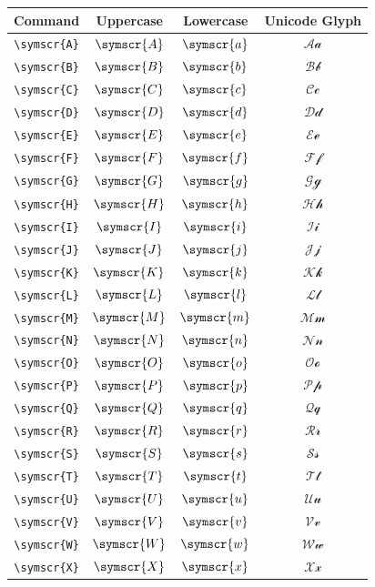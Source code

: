 \documentclass[12pt,a4paper]{article}
\begin{document}
\begin{longtable}{|c|c|c|c|}
\hline
\textbf{Command} & \textbf{Uppercase} & \textbf{Lowercase} & \textbf{Unicode Glyph} \\
\hline
\verb|\symscr{A}| & $\symscr{A}$ & $\symscr{a}$ & $ 𝒜 𝒶 $ \\
\verb|\symscr{B}| & $\symscr{B}$ & $\symscr{b}$ & $ ℬ 𝒷 $ \\
\verb|\symscr{C}| & $\symscr{C}$ & $\symscr{c}$ & $ 𝒞 𝒸 $ \\
\verb|\symscr{D}| & $\symscr{D}$ & $\symscr{d}$ & $ 𝒟 𝒹 $ \\
\verb|\symscr{E}| & $\symscr{E}$ & $\symscr{e}$ & $ ℰ ℯ $ \\
\verb|\symscr{F}| & $\symscr{F}$ & $\symscr{f}$ & $ ℱ 𝒻 $ \\
\verb|\symscr{G}| & $\symscr{G}$ & $\symscr{g}$ & $ 𝒢 ℊ $ \\
\verb|\symscr{H}| & $\symscr{H}$ & $\symscr{h}$ & $ ℋ 𝒽 $ \\
\verb|\symscr{I}| & $\symscr{I}$ & $\symscr{i}$ & $ ℐ 𝒾 $ \\
\verb|\symscr{J}| & $\symscr{J}$ & $\symscr{j}$ & $ 𝒥 𝒿 $ \\
\verb|\symscr{K}| & $\symscr{K}$ & $\symscr{k}$ & $ 𝒦 𝓀 $ \\
\verb|\symscr{L}| & $\symscr{L}$ & $\symscr{l}$ & $ ℒ 𝓁 $ \\
\verb|\symscr{M}| & $\symscr{M}$ & $\symscr{m}$ & $ ℳ 𝓂 $ \\
\verb|\symscr{N}| & $\symscr{N}$ & $\symscr{n}$ & $ 𝒩 𝓃 $ \\
\verb|\symscr{O}| & $\symscr{O}$ & $\symscr{o}$ & $ 𝒪 ℴ $ \\
\verb|\symscr{P}| & $\symscr{P}$ & $\symscr{p}$ & $ 𝒫 𝓅 $ \\
\verb|\symscr{Q}| & $\symscr{Q}$ & $\symscr{q}$ & $ 𝒬 𝓆 $ \\
\verb|\symscr{R}| & $\symscr{R}$ & $\symscr{r}$ & $ ℛ 𝓇 $ \\
\verb|\symscr{S}| & $\symscr{S}$ & $\symscr{s}$ & $ 𝒮 𝓈 $ \\
\verb|\symscr{T}| & $\symscr{T}$ & $\symscr{t}$ & $ 𝒯 𝓉 $ \\
\verb|\symscr{U}| & $\symscr{U}$ & $\symscr{u}$ & $ 𝒰 𝓊 $ \\
\verb|\symscr{V}| & $\symscr{V}$ & $\symscr{v}$ & $ 𝒱 𝓋 $ \\
\verb|\symscr{W}| & $\symscr{W}$ & $\symscr{w}$ & $ 𝒲 𝓌 $ \\
\verb|\symscr{X}| & $\symscr{X}$ & $\symscr{x}$ & $ 𝒳 𝓍 $ \\

\end{longtable}
\end{document}
